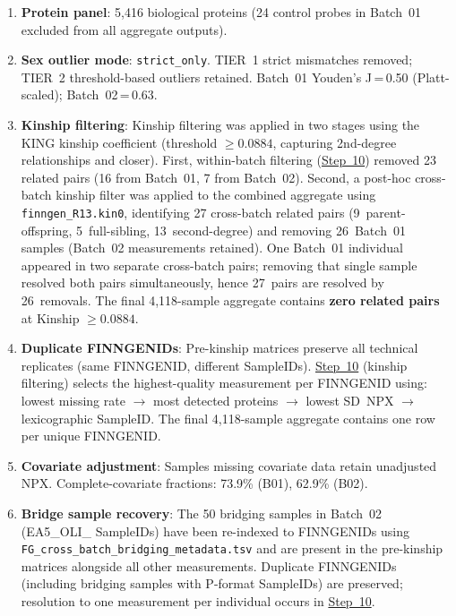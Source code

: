 \documentclass[11pt,a4paper]{article}
\begin{document}
\begin{enumerate}

\item \textbf{Protein panel}: 5,416 biological proteins (24 control probes
  in Batch~01 excluded from all aggregate outputs).

\item \textbf{Sex outlier mode}: \texttt{strict\_only}. TIER~1 strict
  mismatches removed; TIER~2 threshold-based outliers retained. Batch~01
  Youden's J\,=\,0.50 (Platt-scaled); Batch~02\,=\,0.63.

\item \textbf{Kinship filtering}: Kinship filtering was applied in two
  stages using the KING kinship coefficient (threshold $\geq 0.0884$,
  capturing 2nd-degree relationships and closer). First, within-batch
  filtering (\href{https://github.com/FINNGEN/FinnGen3-proteomics-pipeline#pipeline-steps}{Step~10})
  removed 23 related pairs (16 from Batch~01, 7 from Batch~02). Second, a
  post-hoc cross-batch kinship filter was applied to the combined aggregate
  using \texttt{finngen\_R13.kin0}, identifying 27 cross-batch related pairs
  (9~parent-offspring, 5~full-sibling, 13~second-degree) and removing
  26~Batch~01 samples (Batch~02 measurements retained). One Batch~01
  individual appeared in two separate cross-batch pairs; removing that single
  sample resolved both pairs simultaneously, hence 27~pairs are resolved by
  26~removals. The final 4,118-sample aggregate contains \textbf{zero related
  pairs} at Kinship $\geq 0.0884$.

\item \textbf{Duplicate FINNGENIDs}: Pre-kinship matrices preserve all
  technical replicates (same FINNGENID, different SampleIDs). \href{https://github.com/FINNGEN/FinnGen3-proteomics-pipeline#pipeline-steps}{Step~10} (kinship
  filtering) selects the highest-quality measurement per FINNGENID using:
  lowest missing rate $\to$ most detected proteins $\to$ lowest SD~NPX $\to$
  lexicographic SampleID. The final 4,118-sample aggregate contains one row
  per unique FINNGENID.

\item \textbf{Covariate adjustment}: Samples missing covariate data retain
  unadjusted NPX. Complete-covariate fractions: 73.9\% (B01), 62.9\% (B02).

\item \textbf{Bridge sample recovery}: The 50 bridging samples in Batch~02
  (EA5\_OLI\_ SampleIDs) have been re-indexed to FINNGENIDs using
  \texttt{FG\_cross\_batch\_bridging\_metadata.tsv} and are present in the
  pre-kinship matrices alongside all other measurements. Duplicate FINNGENIDs
  (including bridging samples with P-format SampleIDs) are preserved; resolution
  to one measurement per individual occurs in \href{https://github.com/FINNGEN/FinnGen3-proteomics-pipeline#pipeline-steps}{Step~10}.


\end{enumerate}
\end{document}
